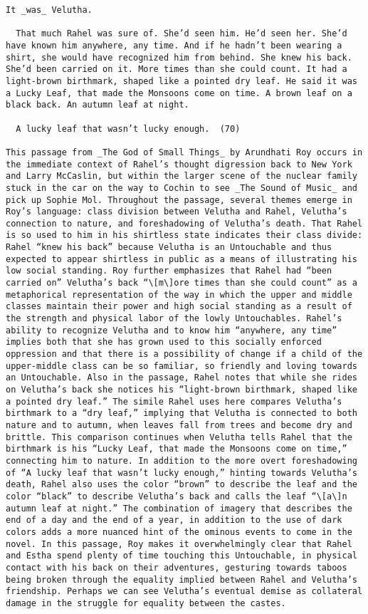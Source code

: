 \documentclass[letterpaper]{article}
\begin{document}
\begin{verbatim}
It _was_ Velutha.

  That much Rahel was sure of. She’d seen him. He’d seen her. She’d have known him anywhere, any time. And if he hadn’t been wearing a shirt, she would have recognized him from behind. She knew his back. She’d been carried on it. More times than she could count. It had a light-brown birthmark, shaped like a pointed dry leaf. He said it was a Lucky Leaf, that made the Monsoons come on time. A brown leaf on a black back. An autumn leaf at night.

  A lucky leaf that wasn’t lucky enough.  (70)

This passage from _The God of Small Things_ by Arundhati Roy occurs in the immediate context of Rahel’s thought digression back to New York and Larry McCaslin, but within the larger scene of the nuclear family stuck in the car on the way to Cochin to see _The Sound of Music_ and pick up Sophie Mol. Throughout the passage, several themes emerge in Roy’s language: class division between Velutha and Rahel, Velutha’s connection to nature, and foreshadowing of Velutha’s death. That Rahel is so used to him in his shirtless state indicates their class divide: Rahel “knew his back” because Velutha is an Untouchable and thus expected to appear shirtless in public as a means of illustrating his low social standing. Roy further emphasizes that Rahel had “been carried on” Velutha’s back “\[m\]ore times than she could count” as a metaphorical representation of the way in which the upper and middle classes maintain their power and high social standing as a result of the strength and physical labor of the lowly Untouchables. Rahel’s ability to recognize Velutha and to know him “anywhere, any time” implies both that she has grown used to this socially enforced oppression and that there is a possibility of change if a child of the upper-middle class can be so familiar, so friendly and loving towards an Untouchable. Also in the passage, Rahel notes that while she rides on Velutha’s back she notices his “light-brown birthmark, shaped like a pointed dry leaf.” The simile Rahel uses here compares Velutha’s birthmark to a “dry leaf,” implying that Velutha is connected to both nature and to autumn, when leaves fall from trees and become dry and brittle. This comparison continues when Velutha tells Rahel that the birthmark is his “Lucky Leaf, that made the Monsoons come on time,” connecting him to nature. In addition to the more overt foreshadowing of “A lucky leaf that wasn’t lucky enough,” hinting towards Velutha’s death, Rahel also uses the color “brown” to describe the leaf and the color “black” to describe Velutha’s back and calls the leaf “\[a\]n autumn leaf at night.” The combination of imagery that describes the end of a day and the end of a year, in addition to the use of dark colors adds a more nuanced hint of the ominous events to come in the novel. In this passage, Roy makes it overwhelmingly clear that Rahel and Estha spend plenty of time touching this Untouchable, in physical contact with his back on their adventures, gesturing towards taboos being broken through the equality implied between Rahel and Velutha’s friendship. Perhaps we can see Velutha’s eventual demise as collateral damage in the struggle for equality between the castes.

\end{verbatim}
\end{document}
